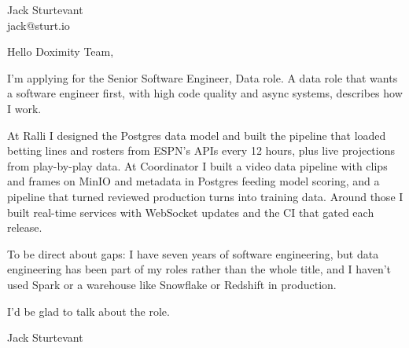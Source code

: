 \documentclass[11pt]{article}
\begin{document}
\raggedright

{\namefont\fontsize{20pt}{24pt}\selectfont Jack Sturtevant}\\[-0.3em]
jack@sturt.io

\vspace{1.2em}

Hello Doximity Team,

I'm applying for the Senior Software Engineer, Data role. A data role that wants a software engineer first, with high code quality and async systems, describes how I work.

At Ralli I designed the Postgres data model and built the pipeline that loaded betting lines and rosters from ESPN's APIs every 12 hours, plus live projections from play-by-play data. At Coordinator I built a video data pipeline with clips and frames on MinIO and metadata in Postgres feeding model scoring, and a pipeline that turned reviewed production turns into training data. Around those I built real-time services with WebSocket updates and the CI that gated each release.

To be direct about gaps: I have seven years of software engineering, but data engineering has been part of my roles rather than the whole title, and I haven't used Spark or a warehouse like Snowflake or Redshift in production.

I'd be glad to talk about the role.

\vspace{0.6em}
Jack Sturtevant
\end{document}
